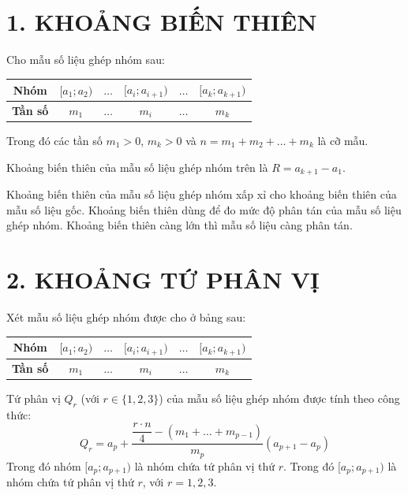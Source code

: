 \documentclass[12pt,a4paper]{extarticle}
\begin{document}
\makeheadbox[headerright={Chương 3},chude={Bài 1},tieude={Khoảng biến thiên, khoảng tứ phân vị, phương sai, độ lệch chuẩn},dinhdang={Xác suất},lop={12 },gv={Nguyễn Lê Minh Ngọc}]
\vspace{2em}
\section*{\color{blue!80!black}1. KHOẢNG BIẾN THIÊN}
\noindent Cho mẫu số liệu ghép nhóm sau:
\begin{center}
    \renewcommand{\arraystretch}{1.5}
    \begin{tabular}{|c|c|c|c|c|c|}
        \hline
        \textbf{Nhóm} & $[a_1; a_2)$ & $\dots$ & $[a_i; a_{i+1})$ & $\dots$ & $[a_k; a_{k+1})$ \\
        \hline
        \textbf{Tần số} & $m_1$ & $\dots$ & $m_i$ & $\dots$ & $m_k$ \\
        \hline
    \end{tabular}
\end{center}
\noindent Trong đó các tần số $m_1 > 0$, $m_k > 0$ và $n = m_1 + m_2 + \dots + m_k$ là cỡ mẫu.
\vspace{1em}
\begin{tcolorbox}[
    colback=blue!5!white,
    colframe=blue!75!black,
    sharp corners,
    boxrule=0pt,
    leftrule=3pt,
    top=8pt,
    bottom=8pt,
    left=12pt
]
    Khoảng biến thiên của mẫu số liệu ghép nhóm trên là \textbf{\color{blue!80!black}$R = a_{k+1} - a_1$}.
\end{tcolorbox}
\vspace{0.5em}
 Khoảng biến thiên của mẫu số liệu ghép nhóm xấp xỉ cho khoảng biến thiên của mẫu số liệu gốc. Khoảng biến thiên dùng để đo mức độ phân tán của mẫu số liệu ghép nhóm. Khoảng biến thiên càng lớn thì mẫu số liệu càng phân tán.
\vspace{2.5em}
\section*{\color{blue!80!black}2. KHOẢNG TỨ PHÂN VỊ}
\noindent Xét mẫu số liệu ghép nhóm được cho ở bảng sau:
\begin{center}
    \renewcommand{\arraystretch}{1.5}
    \begin{tabular}{|c|c|c|c|c|c|}
        \hline
        \textbf{Nhóm} & $[a_1; a_2)$ & $\dots$ & $[a_i; a_{i+1})$ & $\dots$ & $[a_k; a_{k+1})$ \\
        \hline
        \textbf{Tần số} & $m_1$ & $\dots$ & $m_i$ & $\dots$ & $m_k$ \\
        \hline
    \end{tabular}
\end{center}
\noindent Tứ phân vị $Q_r$ (với $r \in \{1, 2, 3\}$) của mẫu số liệu ghép nhóm được tính theo công thức:
\[
\boxed{Q_r = a_p + \frac{\dfrac{r \cdot n}{4} - (m_1 + \dots + m_{p-1})}{m_p}(a_{p+1} - a_p)}
\]
\noindent Trong đó nhóm $[a_p; a_{p+1})$ là nhóm chứa tứ phân vị thứ $r$.
Trong đó $[a_p; a_{p+1})$ là nhóm chứa tứ phân vị thứ $r$, với $r = 1,2,3$.
\end{document}
